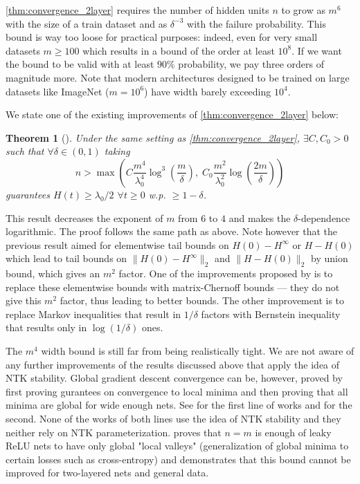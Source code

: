 \documentclass{article}
\newtheorem{theorem}{Theorem}
\begin{document}
    \cref{thm:convergence_2layer} requires the number of hidden units $n$ to grow as $m^6$ with the size of a train dataset and as $\delta^{-3}$ with the failure probability.
    This bound is way too loose for practical purposes: indeed, even for very small datasets $m \geq 100$ which results in a bound of the order at least $10^8$.
    If we want the bound to be valid with at least $90\%$ probability, we pay three orders of magnitude more.
    Note that modern architectures designed to be trained on large datasets like ImageNet ($m=10^6$) have width barely exceeding $10^4$.

    We state one of the existing improvements of \cref{thm:convergence_2layer} below:
    \begin{theorem}[\cite{song2019quadratic}]
        Under the same setting as \cref{thm:convergence_2layer}, $\exists C, C_0 > 0$ such that $\forall \delta \in (0,1)$ taking
        \begin{equation}
            n >
            \max\left(
                C \frac{m^4}{\lambda_0^4} \log^3\left(\frac{m}{\delta}\right), \;
                C_0 \frac{m^2}{\lambda_0^2} \log\left(\frac{2m}{\delta}\right)
            \right)
        \end{equation}
        guarantees $H(t) \geq \lambda_0/2$ $\forall t \geq 0$ w.p. $\geq 1-\delta$.
        \label{thm:convergence_2layer_quartic}
    \end{theorem}
    This result decreases the exponent of $m$ from $6$ to $4$ and makes the $\delta$-dependence logarithmic.
    The proof follows the same path as above.
    Note however that the previous result aimed for elementwise tail bounds on $H(0) - H^\infty$ or $H - H(0)$ which lead to tail bounds on $\|H(0) - H^\infty\|_2$ and $\|H - H(0)\|_2$ by union bound, which gives an $m^2$ factor.
    One of the improvements proposed by \cite{song2019quadratic} is to replace these elementwise bounds with matrix-Chernoff bounds --- they do not give this $m^2$ factor, thus leading to better bounds.
    The other improvement is to replace Markov inequalities that result in $1/\delta$ factors with Bernstein inequality that results only in $\log(1/\delta)$ ones.

    The $m^4$ width bound is still far from being realistically tight.
    We are not aware of any further improvements of the results discussed above that apply the idea of NTK stability.
    Global gradient descent convergence can be, however, proved by first proving gurantees on convergence to local minima and then proving that all minima are global for wide enough nets.
    See \cite{lee2016gradient,panageas2017gradient,mertikopoulos2020almost} for the first line of works and \cite{yu1995local,nguyen2017loss,nguyen2019connected,nguyen2021note} for the second.
    None of the works of both lines use the idea of NTK stability and they neither rely on NTK parameterization.
    \cite{nguyen2019connected} proves that $n = m$ is enough of leaky ReLU nets to have only global "local valleys" (generalization of global minima to certain losses such as cross-entropy) and \cite{nguyen2021note} demonstrates that this bound cannot be improved for two-layered nets and general data.
\end{document}
